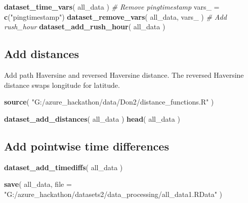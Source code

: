 \documentclass[]{article}
\newenvironment{Shaded}{\begin{snugshade}}{\end{snugshade}}
\newcommand{\CommentTok}[1]{\textcolor[rgb]{0.56,0.35,0.01}{\textit{#1}}}
\newcommand{\DataTypeTok}[1]{\textcolor[rgb]{0.13,0.29,0.53}{#1}}
\newcommand{\KeywordTok}[1]{\textcolor[rgb]{0.13,0.29,0.53}{\textbf{#1}}}
\newcommand{\NormalTok}[1]{#1}
\newcommand{\StringTok}[1]{\textcolor[rgb]{0.31,0.60,0.02}{#1}}
\begin{document}
\begin{Shaded}
\begin{Highlighting}[]
\KeywordTok{dataset_time_vars}\NormalTok{( all_data )}
\CommentTok{# Remove pingtimestamp}
\NormalTok{vars_ =}\StringTok{ }\KeywordTok{c}\NormalTok{(}\StringTok{"pingtimestamp"}\NormalTok{)}
\KeywordTok{dataset_remove_vars}\NormalTok{( all_data, vars_ )}
\CommentTok{# Add rush_hour}
\KeywordTok{dataset_add_rush_hour}\NormalTok{( all_data )}
\end{Highlighting}
\end{Shaded}

\hypertarget{add-distances}{%
\subsection{Add distances}\label{add-distances}}

Add path Haversine and reversed Haversine distance. The reversed
Haversine distance swaps longitude for latitude.

\begin{Shaded}
\begin{Highlighting}[]
\KeywordTok{source}\NormalTok{( }\StringTok{"G:/azure_hackathon/data/Don2/distance_functions.R"}\NormalTok{ )}

\KeywordTok{dataset_add_distances}\NormalTok{( all_data )}
\KeywordTok{head}\NormalTok{( all_data )}
\end{Highlighting}
\end{Shaded}

\hypertarget{add-pointwise-time-differences}{%
\subsection{Add pointwise time
differences}\label{add-pointwise-time-differences}}

\begin{Shaded}
\begin{Highlighting}[]
\KeywordTok{dataset_add_timediffs}\NormalTok{( all_data )}
\end{Highlighting}
\end{Shaded}

\begin{Shaded}
\begin{Highlighting}[]
\KeywordTok{save}\NormalTok{( all_data, }
    \DataTypeTok{file =} \StringTok{"G:/azure_hackathon/datasets2/data_processing/all_data1.RData"}\NormalTok{ )}
\end{Highlighting}
\end{Shaded}
\end{document}
